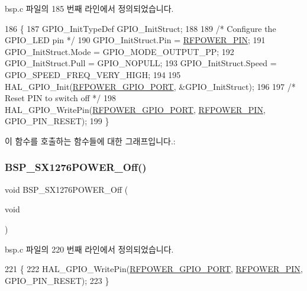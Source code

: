 bsp.\+c 파일의 185 번째 라인에서 정의되었습니다.


\begin{DoxyCode}
186 \{
187   GPIO\_InitTypeDef  GPIO\_InitStruct;
188   
189   \textcolor{comment}{/* Configure the GPIO\_LED pin */}
190     GPIO\_InitStruct.Pin = \mbox{\hyperlink{_lory_s_d_k__hw__conf_8h_a15fab54516f17b1b5a79b1fbfc397d79}{RFPOWER\_PIN}};
191     GPIO\_InitStruct.Mode = GPIO\_MODE\_OUTPUT\_PP;
192     GPIO\_InitStruct.Pull = GPIO\_NOPULL;
193     GPIO\_InitStruct.Speed = GPIO\_SPEED\_FREQ\_VERY\_HIGH;
194   
195     HAL\_GPIO\_Init(\mbox{\hyperlink{_lory_s_d_k__hw__conf_8h_a8f8e11c368ec33b36ed1ba4d84bdc555}{RFPOWER\_GPIO\_PORT}}, &GPIO\_InitStruct);        
196 
197   \textcolor{comment}{/* Reset PIN to switch off */}
198     HAL\_GPIO\_WritePin(\mbox{\hyperlink{_lory_s_d_k__hw__conf_8h_a8f8e11c368ec33b36ed1ba4d84bdc555}{RFPOWER\_GPIO\_PORT}}, \mbox{\hyperlink{_lory_s_d_k__hw__conf_8h_a15fab54516f17b1b5a79b1fbfc397d79}{RFPOWER\_PIN}}, GPIO\_PIN\_RESET);
199 \}
\end{DoxyCode}
이 함수를 호출하는 함수들에 대한 그래프입니다.\+:
\mbox{\label{group___s_t_m32_l1_x_x___n_u_c_l_e_o___b_u_t_t_o_n___functions_ga0514aa0607414fb41ea7e37a58ce6307}} 
\subsubsection{\texorpdfstring{B\+S\+P\+\_\+\+S\+X1276\+P\+O\+W\+E\+R\+\_\+\+Off()}{BSP\_SX1276POWER\_Off()}}
{\footnotesize\ttfamily void B\+S\+P\+\_\+\+S\+X1276\+P\+O\+W\+E\+R\+\_\+\+Off (\begin{DoxyParamCaption}\item[{void}]{ }\end{DoxyParamCaption})}



bsp.\+c 파일의 220 번째 라인에서 정의되었습니다.


\begin{DoxyCode}
221 \{
222   HAL\_GPIO\_WritePin(\mbox{\hyperlink{_lory_s_d_k__hw__conf_8h_a8f8e11c368ec33b36ed1ba4d84bdc555}{RFPOWER\_GPIO\_PORT}}, \mbox{\hyperlink{_lory_s_d_k__hw__conf_8h_a15fab54516f17b1b5a79b1fbfc397d79}{RFPOWER\_PIN}}, GPIO\_PIN\_RESET); 
223 \}
\end{DoxyCode}
\mbox{\label{group___s_t_m32_l1_x_x___n_u_c_l_e_o___b_u_t_t_o_n___functions_gaef6814f684bbf7fa47adda1abc4c1129}} 
